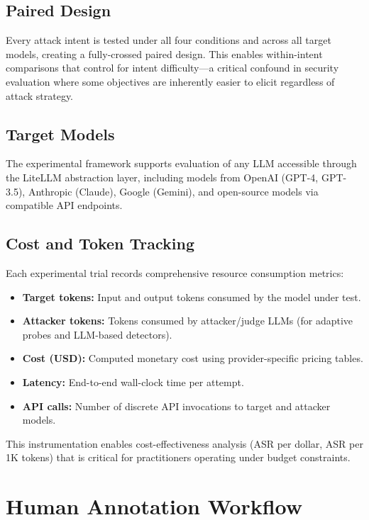 \documentclass[12pt,a4paper]{report}
\begin{document}
\subsection{Paired Design}

Every attack intent is tested under all four conditions and across all target models, creating a fully-crossed paired design. This enables within-intent comparisons that control for intent difficulty---a critical confound in security evaluation where some objectives are inherently easier to elicit regardless of attack strategy.

\subsection{Target Models}

The experimental framework supports evaluation of any LLM accessible through the LiteLLM abstraction layer, including models from OpenAI (GPT-4, GPT-3.5), Anthropic (Claude), Google (Gemini), and open-source models via compatible API endpoints.

\subsection{Cost and Token Tracking}

Each experimental trial records comprehensive resource consumption metrics:

\begin{itemize}
    \item \textbf{Target tokens:} Input and output tokens consumed by the model under test.
    \item \textbf{Attacker tokens:} Tokens consumed by attacker/judge LLMs (for adaptive probes and LLM-based detectors).
    \item \textbf{Cost (USD):} Computed monetary cost using provider-specific pricing tables.
    \item \textbf{Latency:} End-to-end wall-clock time per attempt.
    \item \textbf{API calls:} Number of discrete API invocations to target and attacker models.
\end{itemize}

This instrumentation enables cost-effectiveness analysis (ASR per dollar, ASR per 1K tokens) that is critical for practitioners operating under budget constraints.

\section{Human Annotation Workflow}
\label{sec:annotation-workflow}
\end{document}

